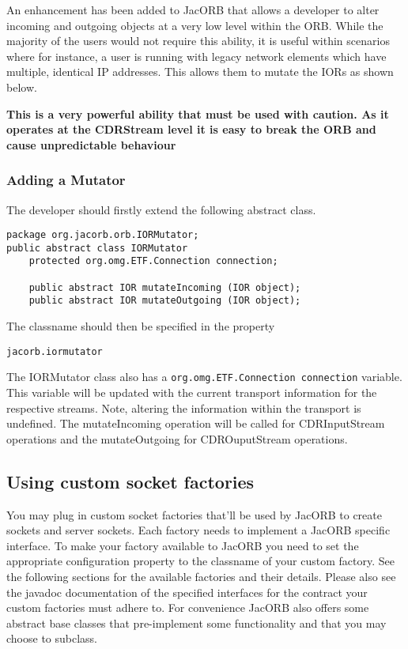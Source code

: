 {{An enhancement has been added to JacORB that allows a developer to alter incoming
and outgoing objects at a very low level within the ORB. While the majority of the
users would not require this ability, it is useful within scenarios where for instance,
a user is running with legacy network elements which have multiple, identical IP
addresses. This allows them to mutate the IORs as shown below.

\textbf{This is a very powerful ability that must be used with caution. As it operates
at the CDRStream level it is easy to break the ORB and cause unpredictable behaviour}

\subsubsection{Adding a Mutator}
The developer should firstly extend the following abstract class.
\begin{small}
\begin{verbatim}
package org.jacorb.orb.IORMutator;
public abstract class IORMutator
    protected org.omg.ETF.Connection connection;

    public abstract IOR mutateIncoming (IOR object);
    public abstract IOR mutateOutgoing (IOR object);
\end{verbatim}
\end{small}
The classname should then be specified in the property
\begin{verbatim}
jacorb.iormutator
\end{verbatim}

The IORMutator class also has a {\tt org.omg.ETF.Connection connection} variable. This
variable will be updated with the current transport information for the respective
streams. Note, altering the information within the transport is undefined. The
mutateIncoming operation will be called for CDRInputStream operations and the
mutateOutgoing for CDROuputStream operations.

\subsection{Using custom socket factories}
\label{sec:customSocketFactories}

You may plug in custom socket factories that'll be used by JacORB to
create sockets and server sockets. Each factory needs to implement a JacORB specific
interface. To make your factory available to JacORB you need to set the appropriate
configuration property to the classname of your custom factory. See the following
sections for the available factories and their details. Please also see the javadoc documentation
of the specified interfaces for the contract your custom factories must adhere to.
For convenience JacORB also offers some abstract base classes that pre-implement some functionality and that you
may choose to subclass.

}}
